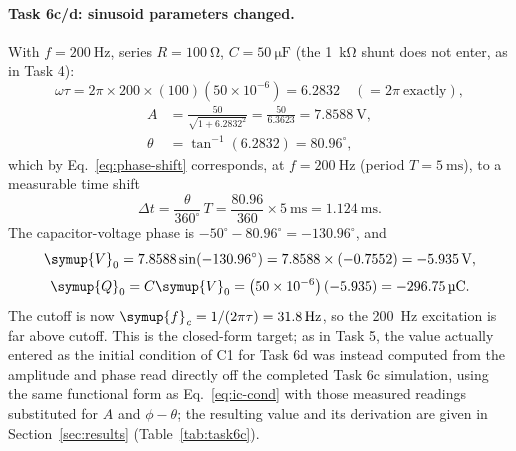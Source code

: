 \documentclass[12pt,a4paper]{article}
\begin{document}
	\paragraph{Task 6c/d: sinusoid parameters changed.}
	With $f = \SI{200}{\hertz}$, series $R = \SI{100}{\ohm}$,
	$C = \SI{50}{\micro\farad}$ (the \SI{1}{\kilo\ohm} shunt does not
	enter, as in Task 4):
	\begin{equation}
		\omega\tau = 2\pi \times 200 \times (100)\left(50\times 10^{-6}\right)
		= 6.2832 \quad \left(= 2\pi\ \text{exactly}\right),
	\end{equation}
	\begin{align}
		A &= \frac{50}{\sqrt{1 + 6.2832^2}}
		= \frac{50}{6.3623} = \SI{7.8588}{\volt},\\
		\theta &= \tan^{-1}(6.2832) = 80.96^{\circ},
	\end{align}
	which by Eq.~\eqref{eq:phase-shift} corresponds, at
	$f = \SI{200}{\hertz}$ (period $T = \SI{5}{\milli\second}$), to a
	measurable time shift
	\begin{equation}
		\Delta t = \frac{\theta}{360^{\circ}}\,T
		= \frac{80.96}{360} \times \SI{5}{\milli\second}
		= \SI{1.124}{\milli\second}.
	\end{equation}
	The capacitor-voltage phase is $-50^\circ - 80.96^\circ =
	-130.96^\circ$, and
	\begin{equation}
		\symup{V}_{0} = 7.8588 \sin(-130.96^{\circ})
		= 7.8588 \times (-0.7552) = \SI{-5.935}{\volt},
	\end{equation}
	\begin{equation}
		\symup{Q}_{0} = C \symup{V}_{0} = \left(50\times 10^{-6}\right)(-5.935)
		= \SI{-296.75}{\micro\coulomb}.
	\end{equation}
	The cutoff is now $\symup{f}_{\mathit{c}} = 1/(2\pi\tau) = \SI{31.8}{\hertz}$, so the
	\SI{200}{\hertz} excitation is far above cutoff.  This is the
	closed-form target; as in Task 5, the value actually entered as
	the initial condition of C1 for Task 6d was instead computed from
	the amplitude and phase read directly off the completed Task 6c
	simulation, using the same functional form as
	Eq.~\eqref{eq:ic-cond} with those measured readings substituted for
	$A$ and $\phi-\theta$; the resulting value and its derivation are
	given in Section~\ref{sec:results} (Table~\ref{tab:task6c}).
	
\end{document}
